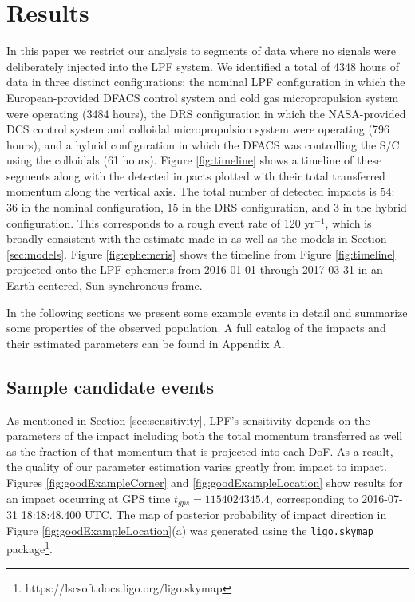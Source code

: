 \documentclass[twocolumn, trackchanges]{aastex62}
\newcommand{\nhours}{4348 }
\begin{document}
\section{Results} \label{sec:results}
In this paper we restrict our analysis to segments of data where no signals were deliberately injected into the LPF system. We identified a total of \nhours hours of data in three distinct configurations: the nominal LPF configuration in which the European-provided DFACS control system and cold gas micropropulsion system were operating (3484 hours), the DRS configuration in which the NASA-provided DCS control system and colloidal micropropulsion system were operating (796 hours), and a hybrid configuration in which the DFACS was controlling the S/C using the colloidals (61 hours). Figure \ref{fig:timeline} shows a timeline of these segments along with the detected impacts plotted with their total transferred momentum along the vertical axis. The total number of detected impacts is 54: 36 in the nominal configuration, 15 in the DRS configuration, and 3 in the hybrid configuration. This corresponds to a rough event rate of 120 yr$^{-1}$, which is broadly consistent with the estimate made in \cite{Thorpe:2015cxa} as well as the models in Section \ref{sec:models}.  Figure \ref{fig:ephemeris} shows the timeline from Figure \ref{fig:timeline} projected onto the LPF ephemeris from 2016-01-01 through 2017-03-31 in an Earth-centered, Sun-synchronous frame.
 
In the following sections we present some example events in detail and summarize some properties of the observed population.  A full catalog of the impacts and their estimated parameters can be found in Appendix A.

\subsection{Sample candidate events \label{sec:samples}}
As mentioned in Section \ref{sec:sensitivity}, LPF's sensitivity depends on the parameters of the impact including both the total momentum transferred as well as the fraction of that momentum that is  projected into each DoF.  As a result, the quality of our parameter estimation varies greatly from impact to impact.  Figures \ref{fig:goodExampleCorner} and \ref{fig:goodExampleLocation} show results for an impact occurring at GPS time $t_{gps}=1154024345.4$, corresponding to 2016-07-31 18:18:48.400 UTC.  The map of posterior probability of impact direction in Figure \ref{fig:goodExampleLocation}(a) was generated using the \texttt{ligo.skymap} package\footnote{https://lscsoft.docs.ligo.org/ligo.skymap}.
\end{document}
